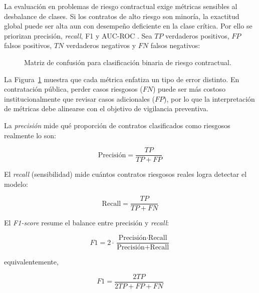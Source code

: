 La evaluación en problemas de riesgo contractual exige métricas sensibles al desbalance de clases. Si los contratos de alto riesgo son minoría, la exactitud global puede ser alta aun con desempeño deficiente en la clase crítica. Por ello se priorizan precisión, \textit{recall}, F1 y AUC-ROC \cite{salazar2024vigia, tas2024machine}. Sea $TP$ verdaderos positivos, $FP$ falsos positivos, $TN$ verdaderos negativos y $FN$ falsos negativos:

\begin{figure}[H]
    \centering
    \shorthandoff{<>}
    \shorthandon{<>}
    \caption{Matriz de confusión para clasificación binaria de riesgo contractual.}
    \label{fig:matriz-confusion-riesgo}
\end{figure}

La Figura~\ref{fig:matriz-confusion-riesgo} muestra que cada métrica enfatiza un tipo de error distinto. En contratación pública, perder casos riesgosos ($FN$) puede ser más costoso institucionalmente que revisar casos adicionales ($FP$), por lo que la interpretación de métricas debe alinearse con el objetivo de vigilancia preventiva.

La \textit{precisión} mide qué proporción de contratos clasificados como riesgosos realmente lo son:

\[
\text{Precisión} = \frac{TP}{TP + FP}
\]

El \textit{recall} (sensibilidad) mide cuántos contratos riesgosos reales logra detectar el modelo:

\[
\text{Recall} = \frac{TP}{TP + FN}
\]

El \textit{F1-score} resume el balance entre precisión y \textit{recall}:

\[
F1 = 2 \cdot \frac{\text{Precisión} \cdot \text{Recall}}{\text{Precisión} + \text{Recall}}
\]

equivalentemente,

\[
F1 = \frac{2TP}{2TP + FP + FN}
\]

